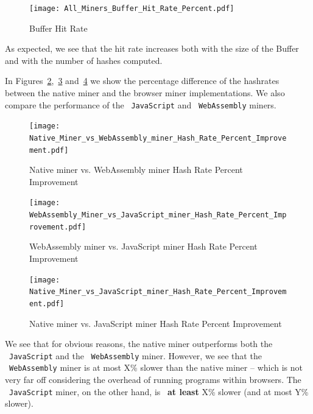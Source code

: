 \documentclass[runningheads]{llncs}
\begin{document}
\begin{figure}[H]
\centering
\texttt{[image: All\_Miners\_Buffer\_Hit\_Rate\_Percent.pdf]}
\caption{\label{fig:bufferRateHM} Buffer Hit Rate}
\end{figure}

As expected, we see that the hit rate increases both with the size of the Buffer and with the number of hashes computed.

In Figures~\ref{fig:NativeWebAsm},~\ref{fig:WebAsmJS} and~\ref{fig:NativeJS} we show the percentage difference of the hashrates between the native miner and the browser miner implementations. We also compare the performance of the ~\verb|JavaScript| and ~\verb|WebAssembly|  miners.

\begin{figure}[h]
\centering
\texttt{[image: Native\_Miner\_vs\_WebAssembly\_miner\_Hash\_Rate\_Percent\_Improvement.pdf]}
\caption{\label{fig:NativeWebAsm} Native miner vs. WebAssembly miner Hash Rate Percent Improvement}
\end{figure}

\begin{figure}[h]
\centering
\texttt{[image: WebAssembly\_Miner\_vs\_JavaScript\_miner\_Hash\_Rate\_Percent\_Improvement.pdf]}
\caption{\label{fig:WebAsmJS} WebAssembly miner vs. JavaScript miner Hash Rate Percent Improvement}
\end{figure}

\begin{figure}[h]
\centering
\texttt{[image: Native\_Miner\_vs\_JavaScript\_miner\_Hash\_Rate\_Percent\_Improvement.pdf]}
\caption{\label{fig:NativeJS} Native miner vs. JavaScript miner Hash Rate Percent Improvement}
\end{figure}



We see that for obvious reasons, the native miner outperforms both the ~\verb|JavaScript| and the ~\verb|WebAssembly| miner. However, we see that the ~\verb|WebAssembly| miner is at most X\% slower than the native miner -- which is not very far off considering the overhead of running programs within browsers. The ~\verb|JavaScript| miner, on the other hand, is ~\textbf{at least} X\% slower (and at most Y\% slower).
\end{document}
